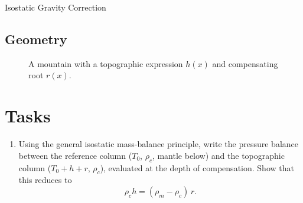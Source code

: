\begin{activity}{Isostatic Gravity Correction}
\subsection*{Geometry}

\begin{figure}[h!]
    \centering
    \caption{A mountain with a topographic expression $h(x)$ and compensating root $r(x)$.}
\end{figure}

\section*{Tasks}

\begin{questions}
    \begin{enumerate}[label=\roman*]
        \item Using the general isostatic mass-balance principle, write the pressure balance between the reference column ($T_0$, $\rho_c$, mantle below) and the topographic column ($T_0+h+r$, $\rho_c$), evaluated at the depth of compensation. Show that this reduces to
        \[
            \rho_c h = (\rho_m - \rho_c)\, r .
        \]
        \answerbox[6cm]


\end{enumerate}
\end{questions}
\end{activity}
